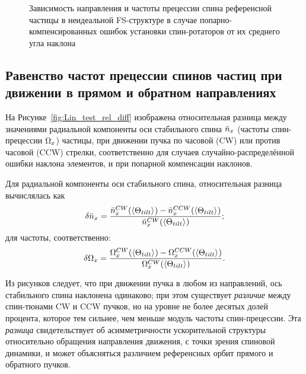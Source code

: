 \begin{figure}[H]
	\centering
\end{figure}
\begin{figure}[H]\centering
	\caption{Зависимость направления и частоты прецессии спина референсной частицы в неидеальной FS-структуре в случае попарно-компенсированных ошибок установки спин-ротаторов от их среднего угла наклона\label{fig:Linearity_test_compensated}}
\end{figure}



\subsection{Равенство частот прецессии спинов частиц при движении в прямом и обратном направлениях}\label{chpt3:imperfections:CW_vs_CCW}
На Рисунке~\ref{fig:Lin_test_rel_diff} изображена относительная разница между значениями
радиальной компоненты оси стабильного спина $\bar n_x$ (частоты спин-прецессии $\Omega_x$) частицы, 
при движении пучка по часовой (CW) или против часовой (CCW) стрелки, соответственно для случаев 
случайно-распределённой ошибки наклона элементов, и при попарной компенсации наклонов.

Для радиальной компоненты оси стабильного спина, относительная разница вычислялась как 
\[
\delta\nbar_x = \frac{\nbar_x^{CW}(\avg{\Theta_{tilt}}) - \nbar_x^{CCW}(\avg{\Theta_{tilt}})}{\nbar_x^{CW}(\avg{\Theta_{tilt}})};
\]
для частоты, соответственно:
\[
\delta\W_x = \frac{\W_x^{CW}(\avg{\Theta_{tilt}}) - \W_x^{CCW}(\avg{\Theta_{tilt}})}{\W_x^{CW}(\avg{\Theta_{tilt}})}.
\]

Из рисунков следует, что при движении пучка в любом из направлений, ось стабильного спина 
наклонена одинаково; при этом существует \emph{различие} между спин-тюнами CW и CCW пучков, но 
на уровне не более десятых долей процента, которое тем сильнее, чем меньше модуль частоты спин-прецессии. 
Эта \emph{разница}  свидетельствует об асимметричности ускорительной структуры 
относительно обращения направления движения, с точки зрения спиновой динамики, 
и может объясняться различием референсных орбит прямого и обратного пучков. 

